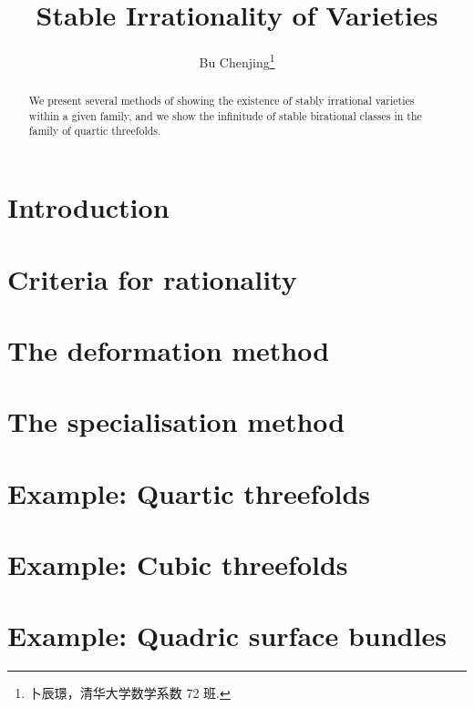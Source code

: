 \documentclass[twoside]{article}
\begin{document}
\title{Stable Irrationality of Varieties}
\author{Bu Chenjing\footnote{卜辰璟，清华大学数学系数 72 班.}}

\begin{abstract}
    We present several methods of showing the existence of
    stably irrational varieties within a given family,
    and we show the infinitude of stable birational classes
    in the family of quartic threefolds.
\end{abstract}

\tableofcontents

\section{Introduction}



\section{Criteria for rationality}



\section{The deformation method} \label{sect-3}



\section{The specialisation method}



\section{Example: Quartic threefolds}



\section{Example: Cubic threefolds}



\section{Example: Quadric surface bundles}



\printbibliography
\end{document}

